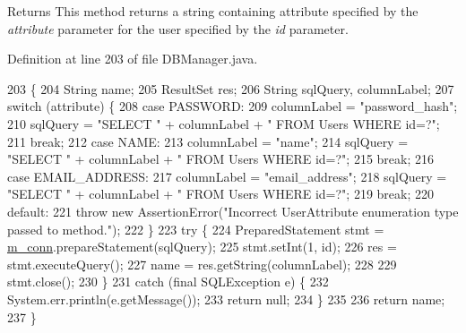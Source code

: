 \begin{DoxyReturn}{Returns}
This method returns a string containing attribute specified by the {\itshape attribute} parameter for the user specified by the {\itshape id} parameter. 
\end{DoxyReturn}


Definition at line 203 of file D\+B\+Manager.\+java.


\begin{DoxyCode}
203                                                                                       \{
204         String name;
205         ResultSet res;
206         String sqlQuery, columnLabel;
207         \textcolor{keywordflow}{switch} (attribute) \{
208             \textcolor{keywordflow}{case} PASSWORD:
209                 columnLabel = \textcolor{stringliteral}{"password\_hash"};
210                 sqlQuery = \textcolor{stringliteral}{"SELECT "} + columnLabel + \textcolor{stringliteral}{" FROM Users WHERE id=?"};
211                 \textcolor{keywordflow}{break};
212             \textcolor{keywordflow}{case} NAME:
213                 columnLabel = \textcolor{stringliteral}{"name"};
214                 sqlQuery = \textcolor{stringliteral}{"SELECT "} + columnLabel + \textcolor{stringliteral}{" FROM Users WHERE id=?"};
215                 \textcolor{keywordflow}{break};
216             \textcolor{keywordflow}{case} EMAIL\_ADDRESS:
217                 columnLabel = \textcolor{stringliteral}{"email\_address"};
218                 sqlQuery = \textcolor{stringliteral}{"SELECT "} + columnLabel + \textcolor{stringliteral}{" FROM Users WHERE id=?"};
219                 \textcolor{keywordflow}{break};
220             \textcolor{keywordflow}{default}:
221                 \textcolor{keywordflow}{throw} \textcolor{keyword}{new} AssertionError(\textcolor{stringliteral}{"Incorrect UserAttribute enumeration type passed to method."});
222         \}
223         \textcolor{keywordflow}{try} \{
224             PreparedStatement stmt = \mbox{\hyperlink{classcom_1_1activitytracker_1_1_d_b_manager_a064088d13ac09eb147fdc19268771521}{m\_conn}}.prepareStatement(sqlQuery);
225             stmt.setInt(1, \textcolor{keywordtype}{id});
226             res = stmt.executeQuery();
227             name = res.getString(columnLabel);
228 
229             stmt.close();
230         \}
231         \textcolor{keywordflow}{catch} (\textcolor{keyword}{final} SQLException e) \{
232             System.err.println(e.getMessage());
233             \textcolor{keywordflow}{return} null;
234         \}
235 
236         \textcolor{keywordflow}{return} name;
237     \}
\end{DoxyCode}
\mbox{\label{classcom_1_1activitytracker_1_1_d_b_manager_a41df4600bb5901a26a4ea6a7108a70b9}} 
